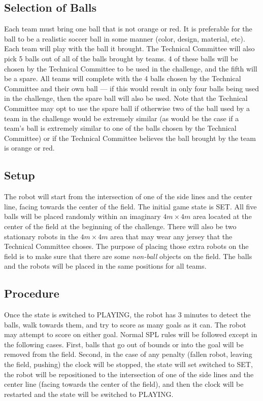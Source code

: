 \documentclass[12pt]{article}
\begin{document}
\subsection{Selection of Balls}

Each team must bring one ball that is not orange or red.  It is preferable for the ball to be a realistic soccer ball in some manner (color, design, material, etc). Each team will play with the ball it brought.  The Technical Committee will also pick 5 balls out of all of the balls brought by teams.  4 of these balls will be chosen by the Technical Committee to be used in the challenge, and the fifth will be a spare.  All teams will complete with the 4 balls chosen by the Technical Committee and their own ball --- if this would result in only four balls being used in the challenge, then the spare ball will also be used.  Note that the Technical Committee may opt to use the spare ball if otherwise two of the ball used by a team in the challenge would be extremely similar (as would be the case if a team's ball is extremely similar to one of the balls chosen by the Technical Committee) or if the Technical Committee believes the ball brought by the team is orange or red.

\subsection{Setup}

The robot will start from the intersection of one of the side lines and the center line, facing towards the center of the field. The initial game state is SET. All five balls will be placed randomly within an imaginary $4m \times 4m$ area located at the center of the field at the beginning of the challenge.  There will also be two stationary robots in the  $4m \times 4m$ area that may wear any jersey that the Technical Committee choses. The purpose of placing those extra robots on the field is to make sure that there are some \emph{non-ball} objects on the field. The balls and the robots will be placed in the same positions for all teams.

\subsection{Procedure}

Once the state is switched to PLAYING, the robot has 3 minutes to detect the balls, walk towards them, and try to score as many goals as it can. The robot may attempt to score on either goal.  Normal SPL rules will be followed except in the following cases.  First, balls that go out of bounds or into the goal will be removed from the field. Second, in the case of any penalty (fallen robot, leaving the field, pushing) the clock will be stopped, the state will set switched to SET, the robot will be repositioned to the intersection of one of the side lines and the center line (facing towards the center of the field), and then the clock will be restarted and the state will be switched to PLAYING.
\end{document}
